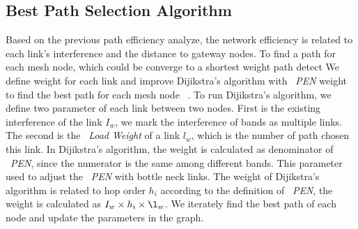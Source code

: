 




\subsection{Best Path Selection Algorithm}
\label{subsec:step}

Based on the previous path efficiency analyze, the network efficiency is related to each link's interference and the distance to gateway nodes. To find a path for each mesh node, which could be converge to a shortest weight path detect
We define weight for each link and improve Dijikstra's algorithm with ~\emph{PEN} weight to find the best path for each mesh node ~\cite{golden1976shortest}.
To run Dijikstra's algorithm, we define two parameter of each link between two nodes. First is the existing interference of the link $I_w$, we mark the interference of bands as multiple links. 
The second is the ~\emph{Load Weight} of a link $l_w$, which is the number of path chosen this link. In Dijikstra's algorithm, the weight is calculated as denominator of ~\emph{PEN}, since the numerator is the same among different bands.
This parameter used to adjust the ~\emph{PEN} with bottle neck links.
The weight of Dijikstra's algorithm is related to hop order $h_i$ according to the definition of ~\emph{PEN}, the weight is calculated as $I_w\times h_i \times \l_w$.
We iterately find the best path of each node and update the parameters in the graph.






